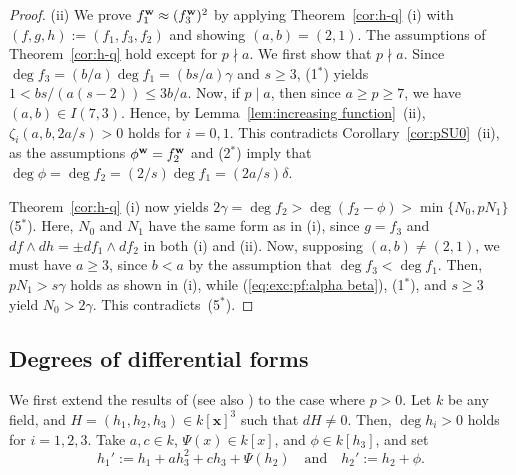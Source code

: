 \documentclass{amsart}
\theoremstyle{plain}
\theoremstyle{definition}
\newcommand{\x}{{\boldsymbol x}}
\newcommand{\w}{{\bf w}}
\newcommand{\kx}{k[\x]}
\begin{document}
\begin{proof}
(ii) 
We prove $f_1^{\w }\approx (f_3^{\w })^2$ 
by applying Theorem~\ref{cor:h-q} (i) 
with $(f,g,h):=(f_1,f_3,f_2)$ and showing $(a,b)=(2,1)$. 
The assumptions of Theorem~\ref{cor:h-q} hold except for $p\nmid a$. 
We first show that $p\nmid a$. 
Since $\deg f_3=(b/a)\deg f_1=(bs/a)\gamma $ 
and $s\ge 3$, 
(1$^*$) yields $1<bs/(a(s-2))\le 3b/a$. 
Now, if $p\mid a$, 
then since $a\ge p\ge 7$, 
we have $(a,b)\in I(7,3)$. 
Hence, 
by Lemma~\ref{lem:increasing function}~(ii), 
$\zeta _i(a,b,2a/s)>0$ holds for $i=0,1$. 
This contradicts Corollary~\ref{cor:pSU0}~(ii), 
as the assumptions $\phi ^{\w }=f_2^{\w }$ and (2$^*$) 
imply that $\deg \phi =\deg f_2=(2/s)\deg f_1=(2a/s)\delta $. 



Theorem~\ref{cor:h-q} (i) now yields 
$2\gamma =\deg f_2>\deg (f_2-\phi )>\min \{ N_0,pN_1\} $ (5$^*$). 
Here, 
$N_0$ and $N_1$ have the same form as in (i), 
since $g=f_3$ and $df\wedge dh=\pm df_1\wedge df_2$
in both (i) and (ii). 
Now,
supposing $(a,b)\ne (2,1)$, 
we must have $a\ge 3$, 
since $b<a$ by the assumption that $\deg f_3<\deg f_1$. 
Then, 
$pN_1>s\gamma $ holds as shown in (i), 
while (\ref{eq:exc:pf:alpha beta}), (1$^*$), and $s\ge 3$ yield 
$N_0>2\gamma $. 
This contradicts~(5$^*$). 
\end{proof}


\subsection{Degrees of differential forms}\label{sect:cofactor}



We first extend the results of \cite[\S ~1.3.5]{JC} 
(see also \cite[Lemma 3.5]{tame3}) to the case where $p>0$. 
Let $k$ be any field, 
and $H=(h_1,h_2,h_3)\in \kx ^3$ such that $dH\ne 0$. 
Then, $\deg h_i>0$ holds for $i=1,2,3$. 
Take $a,c\in k$, 
$\Psi (x)\in k[x]$, 
and $\phi \in k[h_3]$, 
and set
\begin{equation}\label{eq:k1k2!}
h_1':=h_1+ah_3^2+ch_3+\Psi (h_2)\quad\text{and}\quad 
h_2':=h_2+\phi . 
\end{equation}
\end{document}
